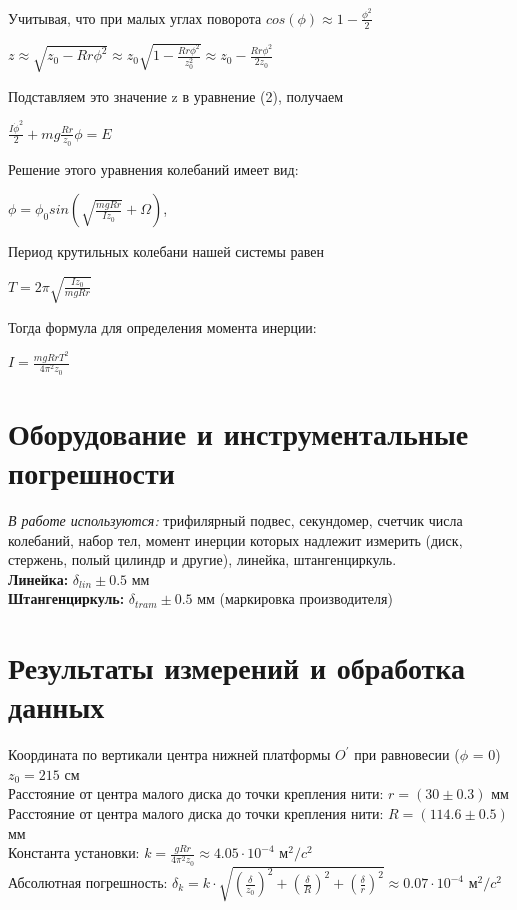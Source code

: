 \documentclass[10px]{article}
\begin{document}
Учитывая, что при малых углах поворота $cos(\phi) \approx 1 - \frac{\phi^2}{2}$
\begin{center}
    $z \approx \sqrt{z_0 - Rr\phi^2} \approx z_0\sqrt{1-\frac{Rr\phi^2} {z_0^2}} \approx z_0 - \frac{Rr\phi^2}{2z_0}$
\end{center}
Подставляем это значение z в уравнение (2), получаем
\begin{center}
     $\frac{I {\dot{\phi}}^2}{2} + mg\frac{Rr}{z_0}\phi = E$
\end{center}
Решение этого уравнения колебаний имеет вид:
\begin{center}
     $\phi = \phi_0 sin\left(\sqrt{\frac{mgRr}{Iz_0}} + \Omega\right)$,
\end{center}
Период крутильных колебани нашей системы равен 
\begin{center}
    $T = 2\pi\sqrt{\frac{Iz_0}{mgRr}}$
\end{center}
Тогда формула для определения момента инерции:
\begin{center}
    $I = \frac{mgRrT^2}{4 \pi^2 z_0}$
\end{center}

\section{Оборудование и инструментальные погрешности}
\textit{В работе используются:} трифилярный подвес, секундомер, счетчик числа колебаний, набор тел, момент инерции которых надлежит измерить (диск, стержень, полый цилиндр и другие), линейка, штангенциркуль. \\
\textbf{Линейка:} $\delta_{lin} \pm 0.5$ мм \\
\textbf{Штангенциркуль:} $\delta_{tram} \pm 0.5$ мм (маркировка производителя)
\section{Результаты измерений и обработка данных}

Координата по вертикали центра нижней платформы $O^\prime$ при равновесии ($\phi$ = 0) $z_0 = 215$ см \\
Расстояние от центра малого диска до точки крепления нити: $r = (30 \pm 0.3)$ мм\\
Расстояние от центра малого диска до точки крепления нити: $R = (114.6 \pm 0.5)$ мм\\
Константа установки: $k = \frac{gRr}{4 \pi^2 z_0} \approx 4.05 \cdot 10^{-4}$ м$^2/c^2$ \\
Абсолютная погрешность: $\delta_k = k \cdot \sqrt{\left(\frac{\delta}{z_0}\right)^2 + \left(\frac{\delta}{R}\right)^2 + \left(\frac{\delta}{r}\right)^2 } \approx 0.07 \cdot 10^{-4}$ м$^2/c^2$
\end{document}
